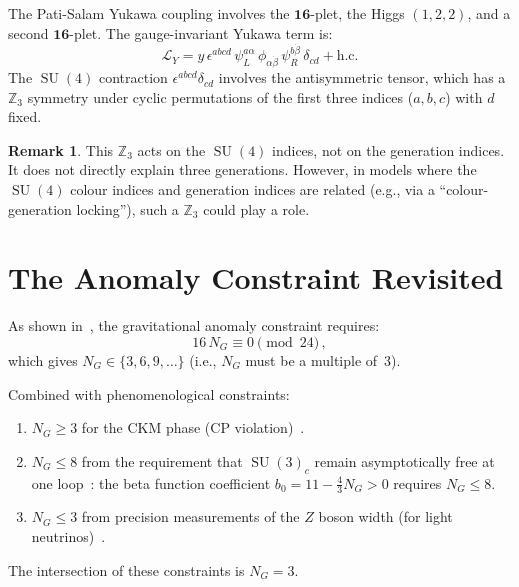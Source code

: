 \documentclass[12pt,a4paper]{article}
\theoremstyle{definition}
\newtheorem{remark}[theorem]{Remark}
\newcommand{\SU}{\operatorname{SU}}
\newcommand{\Z}{\mathbb{Z}}
\begin{document}
The Pati-Salam Yukawa coupling involves the $\mathbf{16}$-plet, the Higgs $(1,2,2)$, and a second $\mathbf{16}$-plet.
The gauge-invariant Yukawa term is:
\begin{equation}
\mathcal{L}_Y = y\, \epsilon^{abcd}\, \psi_L^{a\alpha}\, \phi_{\alpha\dot\beta}\, \psi_R^{b\dot\beta}\, \delta_{cd} + \text{h.c.}
\end{equation}
The $\SU(4)$ contraction $\epsilon^{abcd} \delta_{cd}$ involves the antisymmetric tensor, which has a $\Z_3$ symmetry under cyclic permutations of the first three indices ($a, b, c$) with $d$ fixed.

\begin{remark}
This $\Z_3$ acts on the $\SU(4)$ indices, not on the generation indices.
It does not directly explain three generations.
However, in models where the $\SU(4)$ colour indices and generation indices are related (e.g., via a ``colour-generation locking''), such a $\Z_3$ could play a role.
\end{remark}


\section{The Anomaly Constraint Revisited}
\label{sec:anomaly}

As shown in~\cite{Paper4}, the gravitational anomaly constraint requires:
\begin{equation}
16\, N_G \equiv 0 \pmod{24}\,,
\end{equation}
which gives $N_G \in \{3, 6, 9, \ldots\}$ (i.e., $N_G$ must be a multiple of~$3$).

Combined with phenomenological constraints:
\begin{enumerate}[nosep]
\item $N_G \geq 3$ for the CKM phase (CP violation)~\cite{KobayashiMaskawa1973}.
\item $N_G \leq 8$ from the requirement that $\SU(3)_c$ remain asymptotically free at one loop~\cite{GrossWilczek1973}: the beta function coefficient $b_0 = 11 - \tfrac{4}{3}N_G > 0$ requires $N_G \leq 8$.
\item $N_G \leq 3$ from precision measurements of the $Z$ boson width (for light neutrinos)~\cite{PDG2024}.
\end{enumerate}

The intersection of these constraints is $N_G = 3$.
\end{document}

